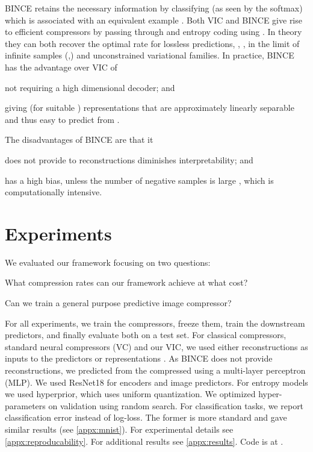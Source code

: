 \documentclass[final]{article}
\begin{document}
BINCE retains the necessary information by classifying (as seen by the softmax) which  is associated with an equivalent example .
Both VIC and BINCE give rise to efficient compressors by passing  through  and entropy coding using .
In theory they can both recover the optimal rate for lossless predictions, \ie, , in the limit of infinite samples (,) and unconstrained variational families.
In practice, BINCE  has the advantage over VIC of 
\begin{inlinelist}
\item not requiring a high dimensional decoder; and
\item  giving (for suitable ) representations that are approximately linearly separable \cite{saunshi_theoretical_2019,tosh_contrastive_2021,lee_predicting_2020} and thus easy to predict from \cite{chen_simple_2020,oord_representation_2019}.
\end{inlinelist}
The disadvantages of BINCE are that it
\begin{inlinelist}
\item does not provide to reconstructions diminishes interpretability; and
\item has a high bias, unless the number of negative samples  is large \cite{poole_variational_2019,song_multi-label_2020}, which is computationally intensive.
\end{inlinelist}
















 
\section{Experiments}
\label{sec:experiments}
We evaluated our framework focusing on two questions:
\begin{inlinelist}
\item What compression rates can our framework achieve at what cost?
\item Can we train a general purpose predictive image compressor?
\end{inlinelist}
For all experiments, we train the compressors, freeze them, train the downstream predictors, and finally evaluate both on a test set.
For classical compressors, standard neural compressors (VC) and our VIC, we used either reconstructions  as inputs to the predictors or representations .
As BINCE does not provide reconstructions, we predicted from the compressed  using a multi-layer perceptron (MLP).
We used ResNet18 \cite{he_deep_2016} for encoders and image predictors.
For entropy models we used  hyperprior, which uses uniform quantization.
We optimized hyper-parameters on validation using random search.
For classification tasks, we report classification error instead of log-loss.
The former is more standard and gave similar results (see \cref{appx:mnist}).
For experimental details see \cref{appx:reproducability}. 
For additional results see \cref{appx:results}.
Code is at \codeurl{}.
\end{document}

